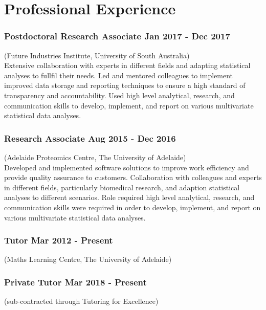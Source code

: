 \documentclass[a4paper,12pt]{report}
\begin{document}
\vspace{1cm}
\section*{Professional Experience}

\subsubsection*{Postdoctoral Research Associate  \hfill Jan 2017 - Dec 2017} \vspace{-6pt}
(Future Industries Institute, University of South Australia) \\[4pt]

Extensive collaboration with experts in different fields and adapting statistical
analyses to fullfil their needs. Led and mentored colleagues to implement
improved data storage and reporting techniques to ensure a high standard of transparency
and accountability. Used high level analytical, research, and communication skills to develop, 
implement, and report on various multivariate statistical data analyses.

\subsubsection*{Research Associate  \hfill Aug 2015 - Dec 2016} \vspace{-6pt}
(Adelaide Proteomics Centre, The University of Adelaide) \\[4pt]

Developed and implemented software solutions to improve work efficiency
and provide quality assurance to customers. Collaboration with colleagues and experts
in different fields, particularly biomedical research, and adaption statistical analyses to
different scenarios. Role required high level analytical, research, and communication skills
were required in order to develop, implement, and report on various multivariate statistical
data analyses.

\subsubsection*{Tutor \hfill Mar 2012 - Present} \vspace{-6pt}
(Maths Learning Centre, The University of Adelaide) \\[4pt]

\subsubsection*{Private Tutor \hfill Mar 2018 - Present} \vspace{-6pt}
(sub-contracted through Tutoring for Excellence) \\[4pt]
\end{document}
